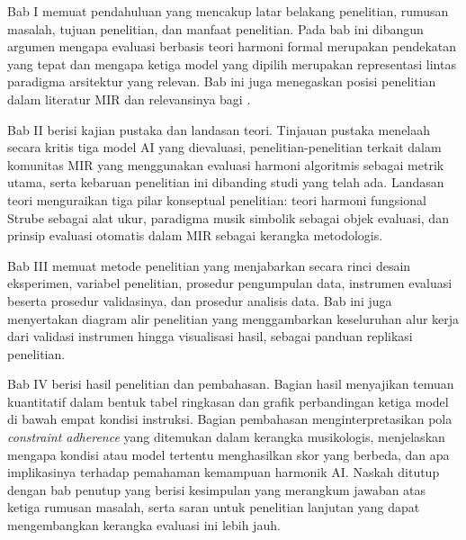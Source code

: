 Bab I memuat pendahuluan yang mencakup latar belakang penelitian, rumusan masalah, tujuan penelitian, dan manfaat penelitian. Pada bab ini dibangun argumen mengapa evaluasi berbasis teori harmoni formal merupakan pendekatan yang tepat dan mengapa ketiga model yang dipilih merupakan representasi lintas paradigma arsitektur yang relevan. Bab ini juga menegaskan posisi penelitian dalam literatur MIR dan relevansinya bagi \programstudy{} \institutionname{}.

Bab II berisi kajian pustaka dan landasan teori. Tinjauan pustaka menelaah secara kritis tiga model AI yang dievaluasi, penelitian-penelitian terkait dalam komunitas MIR yang menggunakan evaluasi harmoni algoritmis sebagai metrik utama, serta kebaruan penelitian ini dibanding studi yang telah ada. Landasan teori menguraikan tiga pilar konseptual penelitian: teori harmoni fungsional Strube sebagai alat ukur, paradigma musik simbolik sebagai objek evaluasi, dan prinsip evaluasi otomatis dalam MIR sebagai kerangka metodologis.

Bab III memuat metode penelitian yang menjabarkan secara rinci desain eksperimen, variabel penelitian, prosedur pengumpulan data, instrumen evaluasi beserta prosedur validasinya, dan prosedur analisis data. Bab ini juga menyertakan diagram alir penelitian yang menggambarkan keseluruhan alur kerja dari validasi instrumen hingga visualisasi hasil, sebagai panduan replikasi penelitian.

Bab IV berisi hasil penelitian dan pembahasan. Bagian hasil menyajikan temuan kuantitatif dalam bentuk tabel ringkasan dan grafik perbandingan ketiga model di bawah empat kondisi instruksi. Bagian pembahasan menginterpretasikan pola \textit{constraint adherence} yang ditemukan dalam kerangka musikologis, menjelaskan mengapa kondisi atau model tertentu menghasilkan skor yang berbeda, dan apa implikasinya terhadap pemahaman kemampuan harmonik AI. Naskah ditutup dengan bab penutup yang berisi kesimpulan yang merangkum jawaban atas ketiga rumusan masalah, serta saran untuk penelitian lanjutan yang dapat mengembangkan kerangka evaluasi ini lebih jauh.
